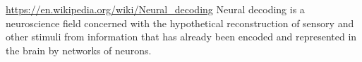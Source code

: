 \documentclass[a4paper]{standalone}
\begin{document}
    \url{https://en.wikipedia.org/wiki/Neural_decoding}
    Neural decoding is a neuroscience field concerned with the hypothetical reconstruction of sensory and other stimuli from information that has already been encoded and represented in the brain by networks of neurons.
\end{document}
